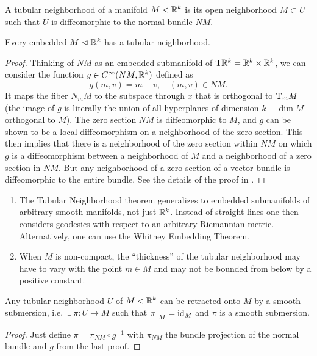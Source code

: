 \begin{defn}
    A tubular neighborhood of a manifold $M\vartriangleleft \mathbb{R}^k$ is its open neighborhood $M\subset U$ such that $U$ is diffeomorphic to the normal bundle $NM$.
\end{defn}

\begin{thm}\label{thm tubular neighb}
    Every embedded $M\vartriangleleft \mathbb{R}^k$ has a tubular neighborhood.
\end{thm}
\begin{proof}
    Thinking of $NM$ as an embedded submanifold of $\mathrm{T}\mathbb{R}^k=\mathbb{R}^k\times\mathbb{R}^k$, we can consider the function $g\in C^\infty(NM,\mathbb{R}^k)$ defined as
    \[
        g(m,v)=m+v,\quad (m,v)\in NM.
    \]
    It maps the fiber $N_m M$ to the subspace through $x$ that is orthogonal to $\mathrm{T}_m M$ (the image of $g$ is literally the union of all hyperplanes of dimension $k-\dim M$ orthogonal to $M$).
    The zero section $NM$ is diffeomorphic to $M$, and $g$ can be shown to be a local diffeomorphism on a neighborhood of the zero section. This then implies that there is a neighborhood of the zero section within $NM$ on which $g$ is a diffeomorphism between a neighborhood of $M$ and a neighborhood of a zero section in $NM$. But any neighborhood of a zero section of a vector bundle is diffeomorphic to the entire bundle. See the details of the proof in \cite[Thm.~6.24]{Lee}.
\end{proof}

\begin{rem}
\begin{enumerate}
    \item The Tubular Neighborhood theorem generalizes to embedded submanifolds of arbitrary smooth manifolds, not just $\mathbb{R}^k$. Instead of straight lines one then considers geodesics with respect to an arbitrary Riemannian metric. Alternatively, one can use the Whitney Embedding Theorem. 
    \item When $M$ is non-compact, the ``thickness'' of the tubular neighborhood may have to vary with the point $m\in M$ and may not be bounded from below by a positive constant.
\end{enumerate}
\end{rem}

\begin{thm}
    Any tubular neighborhood $U$ of $M\vartriangleleft\mathbb{R}^k$ can be retracted onto $M$ by a smooth submersion, i.e.\ $\exists\, \pi:U\to M$ such that $\restr{\pi}{M}=\id_M$ and $\pi$ is a smooth submersion.
\end{thm}
\begin{proof}
    Just define $\pi= \pi_{NM}\circ g^{-1}$ with $\pi_{NM}$ the bundle projection of the normal bundle and $g$ from the last proof.
\end{proof}

